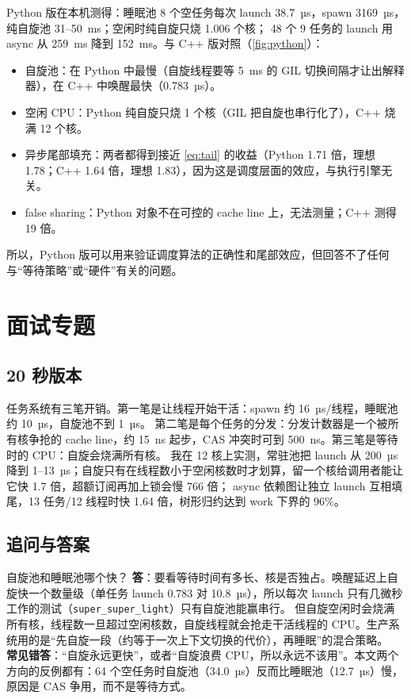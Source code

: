 \documentclass[11pt,a4paper]{ctexart}
\begin{document}
Python 版在本机测得：睡眠池 8 个空任务每次 launch 38.7~µs，spawn 3169~µs，纯自旋池 31--50~ms；空闲时纯自旋只烧 1.006 个核；
48 个 9 任务的 launch 用 async 从 259~ms 降到 152~ms。与 C++ 版对照（\cref{fig:python}）：
\begin{itemize}
\item 自旋池：在 Python 中最慢（自旋线程要等 5~ms 的 GIL 切换间隔才让出解释器），在 C++ 中唤醒最快（0.783~µs）。
\item 空闲 CPU：Python 纯自旋只烧 1 个核（GIL 把自旋也串行化了），C++ 烧满 12 个核。
\item 异步尾部填充：两者都得到接近 \cref{eq:tail} 的收益（Python 1.71 倍，理想 1.78；C++ 1.64 倍，理想 1.83），因为这是调度层面的效应，与执行引擎无关。
\item false sharing：Python 对象不在可控的 cache line 上，无法测量；C++ 测得 19 倍。
\end{itemize}
所以，Python 版可以用来验证调度算法的正确性和尾部效应，但回答不了任何与``等待策略''或``硬件''有关的问题。

\section{面试专题}
\label{sec:interview}

\subsection{20 秒版本}

任务系统有三笔开销。第一笔是让线程开始干活：spawn 约 16~µs/线程，睡眠池约 10~µs，自旋池不到 1~µs。
第二笔是每个任务的分发：分发计数器是一个被所有核争抢的 cache line，约 15~ns 起步，CAS 冲突时可到 500~ns。第三笔是等待时的 CPU：自旋会烧满所有核。
我在 12 核上实测，常驻池把 launch 从 200~µs 降到 1--13~µs；自旋只有在线程数小于空闲核数时才划算，留一个核给调用者能让它快 1.7 倍，超额订阅再加上锁会慢 766 倍；
async 依赖图让独立 launch 互相填尾，13 任务/12 线程时快 1.64 倍，树形归约达到 work 下界的 96\%。

\subsection{追问与答案}

\begin{iqbox}{自旋池和睡眠池哪个快？}
\textbf{答}：要看等待时间有多长、核是否独占。唤醒延迟上自旋快一个数量级（单任务 launch 0.783 对 10.8~µs），所以每次 launch 只有几微秒工作的测试（\texttt{super\_\allowbreak{}super\_\allowbreak{}light}）只有自旋池能赢串行。
但自旋空闲时会烧满所有核，线程数一旦超过空闲核数，自旋线程就会抢走干活线程的 CPU。生产系统用的是``先自旋一段（约等于一次上下文切换的代价），再睡眠''的混合策略。\\
\textbf{常见错答}：``自旋永远更快''，或者``自旋浪费 CPU，所以永远不该用''。本文两个方向的反例都有：64 个空任务时自旋池（34.0~µs）反而比睡眠池（12.7~µs）慢，原因是 CAS 争用，而不是等待方式。
\end{iqbox}
\end{document}
